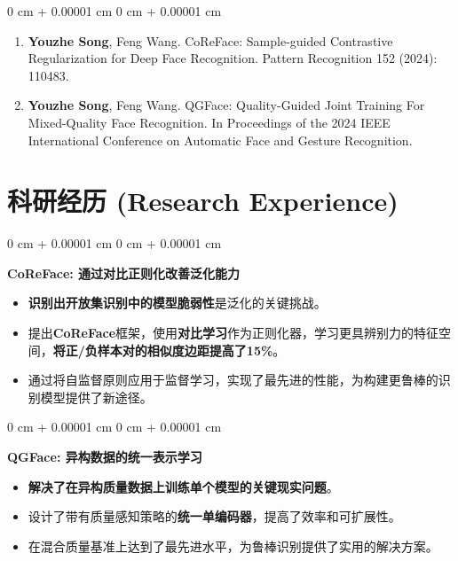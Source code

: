 \documentclass[10pt, letterpaper]{article}
\newenvironment{highlights}{
    \begin{itemize}[
        topsep=0.05 cm,
        parsep=0.05 cm,
        partopsep=0pt,
        itemsep=0pt,
        leftmargin=0.4 cm + 10pt
    ]
}{
    \end{itemize}
} %
\newenvironment{onecolentry}{
    \begin{adjustwidth}{
        0 cm + 0.00001 cm
    }{
        0 cm + 0.00001 cm
    }
}{
    \end{adjustwidth}
} %
\begin{document}
\begin{onecolentry}
    \begin{enumerate}[
        label=\arabic*.,
        topsep=0pt,
        parsep=0pt,
        partopsep=0pt,
        itemsep=0.2cm,
        leftmargin=*
    ]
        \item \textbf{Youzhe Song}, Feng Wang. CoReFace: Sample-guided Contrastive Regularization for Deep Face Recognition.
        Pattern Recognition 152 (2024): 110483.
        \href{https://doi.org/10.1016/j.patcog.2024.110483}{\faLink}
        \href{https://github.com/IsidoreSong/CoreFace}{\faGithub}
        
        \item \textbf{Youzhe Song}, Feng Wang. QGFace: Quality-Guided Joint Training For Mixed-Quality Face Recognition.
        In Proceedings of
the 2024 IEEE International Conference on Automatic Face and Gesture Recognition. \href{https://arxiv.org/abs/2312.17494}{\faLink}
        \href{https://github.com/IsidoreSong/QGFace}{\faGithub}
    \end{enumerate}
\end{onecolentry}

    \section{科研经历 (Research Experience)}
        \begin{onecolentry}
            \textbf{CoReFace: 通过对比正则化改善泛化能力}
            \begin{highlights}
                \item \textbf{识别出开放集识别中的模型脆弱性}是泛化的关键挑战。
                \item 提出\textbf{CoReFace}框架，使用\textbf{对比学习}作为正则化器，学习更具辨别力的特征空间，\textbf{将正/负样本对的相似度边距提高了15\%}。
                \item 通过将自监督原则应用于监督学习，实现了最先进的性能，为构建更鲁棒的识别模型提供了新途径。
            \end{highlights}
        \end{onecolentry}
        \vspace{0.2 cm}
        \begin{onecolentry}
            \textbf{QGFace: 异构数据的统一表示学习}
            \begin{highlights}
                \item \textbf{解决了在异构质量数据上训练单个模型的关键现实问题}。
                \item 设计了带有质量感知策略的\textbf{统一单编码器}，提高了效率和可扩展性。
                \item 在混合质量基准上达到了最先进水平，为鲁棒识别提供了实用的解决方案。
            \end{highlights}
        \end{onecolentry}
\end{document}
